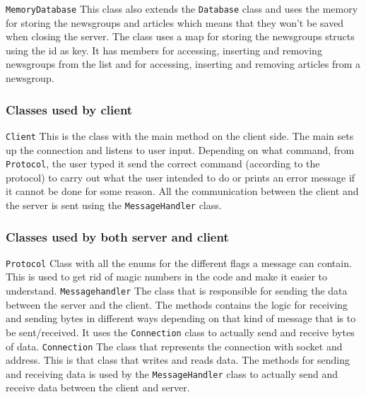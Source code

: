 \documentclass[a4paper]{article}
\def\code#1{\texttt{#1}}
\begin{document}
\newline \newline
\code{MemoryDatabase}\newline
This class also extends the \code{Database} class and uses the memory for storing the newsgroups and articles which means that they won't be saved when closing the server. The class uses a map for storing the newsgroups structs using the id as key. It has members for accessing, inserting and removing newsgroups from the list and for accessing, inserting and removing articles from a newsgroup.
\subsubsection{Classes used by client}

\code{Client}\newline
This is the class with the main method on the client side. The main sets up the connection and listens to user input. Depending on what command, from \code{Protocol}, the user typed it send the correct command (according to the protocol) to carry out what the user intended to do or prints an error message if it cannot be done for some reason.
All the communication between the client and the server is sent using the \code{MessageHandler} class.
 
\subsubsection{Classes used by both server and client}
\code{Protocol}\newline
Class with all the enums for the different flags a message can contain. This is used to get rid of magic numbers in the code and make it easier to understand.
\newline \newline
\code{Messagehandler}\newline
The class that is responsible for sending the data between the server and the client. The methods contains the logic for receiving and sending bytes in different ways depending on that kind of message that is to be sent/received. It uses the \code{Connection} class to actually send and receive bytes of data.
\newline \newline
\code{Connection}\newline
The class that represents the connection with socket and address. This is that class that writes and reads data. The methods for sending and receiving data is used by the \code{MessageHandler} class to actually send and receive data between the client and server.
\end{document}

